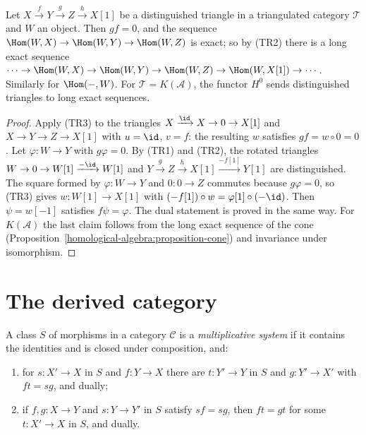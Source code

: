 \begin{proposition}\label{homological-algebra:proposition-cohomological}
Let $X \xrightarrow{f} Y \xrightarrow{g} Z \xrightarrow{h} X[1]$ be a distinguished triangle in a triangulated category $\mathcal{T}$ and $W$ an
object. Then $gf = 0$, and the sequence $\Hom(W, X) \to \Hom(W, Y) \to \Hom(W, Z)$ is exact; so by (TR2) there is a long exact
sequence $\cdots \to \Hom(W, X) \to \Hom(W, Y) \to \Hom(W, Z) \to \Hom(W, X[1]) \to \cdots$. Similarly for $\Hom(-, W)$. For
$\mathcal{T} = K(\mathcal{A})$, the functor $H^0$ sends distinguished triangles to long exact sequences.
\end{proposition}

\begin{proof}
Apply (TR3) to the triangles $X \xrightarrow{\id} X \to 0 \to X[1]$ and $X \to Y \to Z \to X[1]$ with $u = \id$, $v = f$: the resulting $w$
satisfies $gf = w \circ 0 = 0$. Let $\varphi \colon W \to Y$ with $g\varphi = 0$. By (TR1) and (TR2), the rotated triangles
$W \to 0 \to W[1] \xrightarrow{-\id} W[1]$ and $Y \xrightarrow{g} Z \xrightarrow{h} X[1] \xrightarrow{-f[1]} Y[1]$ are distinguished. The square formed by
$\varphi \colon W \to Y$ and $0 \colon 0 \to Z$ commutes because $g\varphi = 0$, so (TR3) gives $w \colon W[1] \to X[1]$ with
$(-f[1]) \circ w = \varphi[1] \circ (-\id)$. Then $\psi = w[-1]$ satisfies $f\psi = \varphi$. The dual statement is proved in the same way. For $K(\mathcal{A})$ the last claim
follows from the long exact sequence of the cone (Proposition~\ref{homological-algebra:proposition-cone}) and invariance under
isomorphism.
\end{proof}

\section{The derived category}\label{homological-algebra:section-derived-category}

\begin{definition}\label{homological-algebra:definition-multiplicative-system}
A class $S$ of morphisms in a category $\mathcal{C}$ is a \emph{multiplicative system} if it contains the identities and is closed
under composition, and:
\begin{enumerate}
\item for $s \colon X' \to X$ in $S$ and $f \colon Y \to X$ there are $t \colon Y' \to Y$ in $S$ and $g \colon Y' \to X'$ with $ft = sg$, and dually;
\item if $f, g \colon X \to Y$ and $s \colon Y \to Y'$ in $S$ satisfy $sf = sg$, then $ft = gt$ for some $t \colon X' \to X$ in $S$, and dually.
\end{enumerate}
\end{definition}

